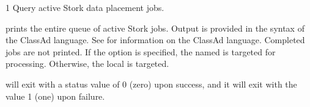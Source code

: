 \begin{ManPage}{\label{man-stork-q}}{1}
{Query active Stork data placement jobs.}

\Synopsis {}
\ToolArgsBase

\Storkname


\Description 

 prints the entire queue of active Stork jobs.
Output is provided in the syntax of the ClassAd language.
See  for information
on the ClassAd language.  Completed jobs are not printed.
If the  option is specified, the named  is targeted
for processing.  Otherwise, the local  is targeted.


\begin{Options}
	\ToolArgsBaseDesc
	\StorknameDesc
\end{Options}

\ExitStatus

 will exit with a status value of 0 (zero) upon success,
and it will exit with the value 1 (one) upon failure.

\end{ManPage}
